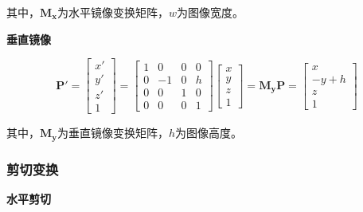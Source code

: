 \documentclass[cn, blue, normal, 12pt]{elegantnote}
\begin{document}
其中，$\bm{M_{x}}$为水平镜像变换矩阵，$w$为图像宽度。

\textbf{垂直镜像}

\begin{equation}
    \bm{P'}=\left[
        \begin{array}{c}
            x' \\ y' \\ z' \\ 1
        \end{array}
    \right]=\left[
        \begin{array}{cccc}
            1 &  0 & 0 & 0 \\
            0 & -1 & 0 & h \\
            0 &  0 & 1 & 0 \\
            0 &  0 & 0 & 1
        \end{array}
    \right]\left[
        \begin{array}{c}
            x \\ y \\ z \\ 1
        \end{array}
    \right]=\bm{M_{y}P}=\left[
        \begin{array}{c}
            x \\ -y+h \\ z \\ 1
        \end{array}
    \right]
\end{equation}

其中，$\bm{M_{y}}$为垂直镜像变换矩阵，$h$为图像高度。

\subsubsection{剪切变换}

\textbf{水平剪切}
\end{document}
